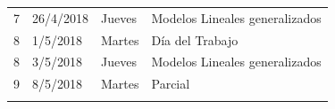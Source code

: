 \documentclass[]{book}
\theoremstyle{definition}
\theoremstyle{definition}
\theoremstyle{definition}
\theoremstyle{remark}
\begin{document}
\begin{longtable}[]{@{}llll@{}}
\begin{minipage}[t]{0.05\columnwidth}
7\strut
\end{minipage} & \begin{minipage}[t]{0.07\columnwidth}\raggedright
26/4/2018\strut
\end{minipage} & \begin{minipage}[t]{0.05\columnwidth}\raggedright
Jueves\strut
\end{minipage} & \begin{minipage}[t]{0.71\columnwidth}\raggedright
Modelos Lineales generalizados\strut
\end{minipage}\tabularnewline
\begin{minipage}[t]{0.05\columnwidth}\raggedright
8\strut
\end{minipage} & \begin{minipage}[t]{0.07\columnwidth}\raggedright
1/5/2018\strut
\end{minipage} & \begin{minipage}[t]{0.05\columnwidth}\raggedright
Martes\strut
\end{minipage} & \begin{minipage}[t]{0.71\columnwidth}\raggedright
Día del Trabajo\strut
\end{minipage}\tabularnewline
\begin{minipage}[t]{0.05\columnwidth}\raggedright
8\strut
\end{minipage} & \begin{minipage}[t]{0.07\columnwidth}\raggedright
3/5/2018\strut
\end{minipage} & \begin{minipage}[t]{0.05\columnwidth}\raggedright
Jueves\strut
\end{minipage} & \begin{minipage}[t]{0.71\columnwidth}\raggedright
Modelos Lineales generalizados\strut
\end{minipage}\tabularnewline
\begin{minipage}[t]{0.05\columnwidth}\raggedright
9\strut
\end{minipage} & \begin{minipage}[t]{0.07\columnwidth}\raggedright
8/5/2018\strut
\end{minipage} & \begin{minipage}[t]{0.05\columnwidth}\raggedright
Martes\strut
\end{minipage} & \begin{minipage}[t]{0.71\columnwidth}\raggedright
Parcial\strut
\end{minipage}\tabularnewline
\begin{minipage}[t]{0.05\columnwidth}\raggedright

\end{minipage}
\end{longtable}
\end{document}
